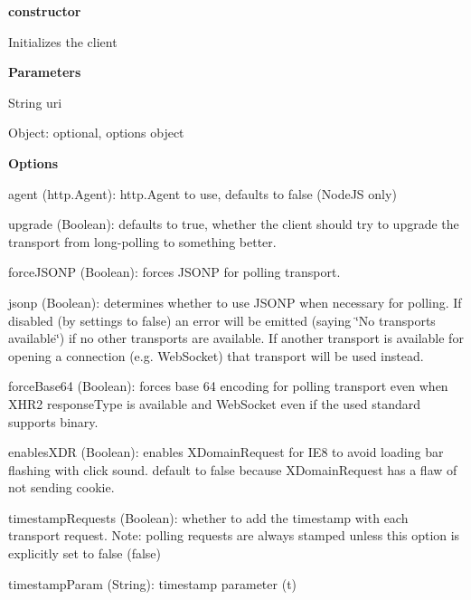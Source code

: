 \begin{DoxyItemize}
\item {\bfseries constructor}
\begin{DoxyItemize}
\item Initializes the client
\item {\bfseries Parameters}
\begin{DoxyItemize}
\item {\ttfamily String} uri
\item {\ttfamily Object}\+: optional, options object
\end{DoxyItemize}
\item {\bfseries Options}
\begin{DoxyItemize}
\item {\ttfamily agent} ({\ttfamily http.\+Agent})\+: {\ttfamily http.\+Agent} to use, defaults to {\ttfamily false} (Node\+JS only)
\item {\ttfamily upgrade} ({\ttfamily Boolean})\+: defaults to true, whether the client should try to upgrade the transport from long-\/polling to something better.
\item {\ttfamily force\+J\+S\+O\+NP} ({\ttfamily Boolean})\+: forces J\+S\+O\+NP for polling transport.
\item {\ttfamily jsonp} ({\ttfamily Boolean})\+: determines whether to use J\+S\+O\+NP when necessary for polling. If disabled (by settings to false) an error will be emitted (saying \char`\"{}\+No transports available\char`\"{}) if no other transports are available. If another transport is available for opening a connection (e.\+g. Web\+Socket) that transport will be used instead.
\item {\ttfamily force\+Base64} ({\ttfamily Boolean})\+: forces base 64 encoding for polling transport even when X\+H\+R2 response\+Type is available and Web\+Socket even if the used standard supports binary.
\item {\ttfamily enables\+X\+DR} ({\ttfamily Boolean})\+: enables X\+Domain\+Request for I\+E8 to avoid loading bar flashing with click sound. default to {\ttfamily false} because X\+Domain\+Request has a flaw of not sending cookie.
\item {\ttfamily timestamp\+Requests} ({\ttfamily Boolean})\+: whether to add the timestamp with each transport request. Note\+: polling requests are always stamped unless this option is explicitly set to {\ttfamily false} ({\ttfamily false})
\item {\ttfamily timestamp\+Param} ({\ttfamily String})\+: timestamp parameter ({\ttfamily t})

\end{DoxyItemize}
\end{DoxyItemize}
\end{DoxyItemize}
